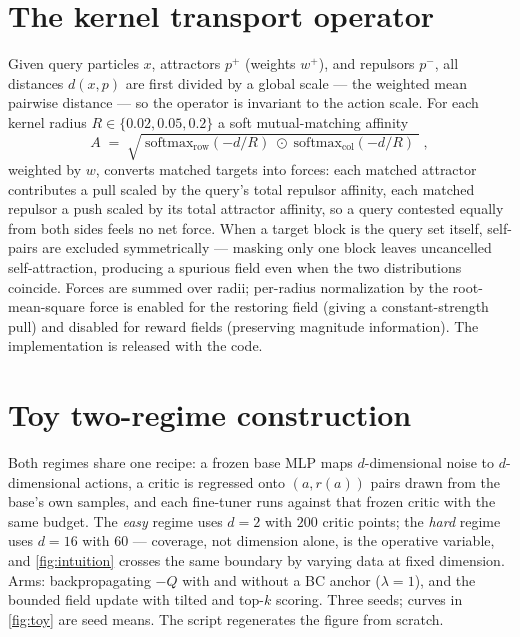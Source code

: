 \section{The kernel transport operator}
\label{app:kernel}

Given query particles $x$, attractors $p^{+}$ (weights $w^{+}$), and
repulsors $p^{-}$, all distances $d(x, p)$ are first divided by a global
scale --- the weighted mean pairwise distance --- so the operator is
invariant to the action scale. For each kernel radius
$R \in \{0.02, 0.05, 0.2\}$ a soft mutual-matching affinity
\begin{equation}
  A \;=\; \sqrt{\;\mathrm{softmax}_{\mathrm{row}}(-d/R)\;\odot\;
                 \mathrm{softmax}_{\mathrm{col}}(-d/R)\;}\;,
\end{equation}
weighted by $w$, converts matched targets into forces: each matched
attractor contributes a pull scaled by the query's total repulsor affinity,
each matched repulsor a push scaled by its total attractor affinity, so a
query contested equally from both sides feels no net force. When a target
block is the query set itself, self-pairs are excluded symmetrically ---
masking only one block leaves uncancelled self-attraction, producing a
spurious field even when the two distributions coincide. Forces are summed
over radii; per-radius normalization by the root-mean-square force is
enabled for the restoring field (giving a constant-strength pull) and
disabled for reward fields (preserving magnitude information). The
implementation is released with the code.

\section{Toy two-regime construction}

Both regimes share one recipe: a frozen base MLP maps $d$-dimensional noise
to $d$-dimensional actions, a critic is regressed onto $(a, r(a))$ pairs
drawn from the base's own samples, and each fine-tuner runs against that
frozen critic with the same budget. The \emph{easy} regime uses $d{=}2$ with
$200$ critic points; the \emph{hard} regime uses $d{=}16$ with $60$ ---
coverage, not dimension alone, is the operative variable, and
\cref{fig:intuition} crosses the same boundary by varying data at fixed
dimension. Arms: backpropagating $-Q$ with and without a BC anchor
($\lambda{=}1$), and the bounded field update with tilted and top-$k$
scoring. Three seeds; curves in \cref{fig:toy} are seed means. The script
regenerates the figure from scratch.

